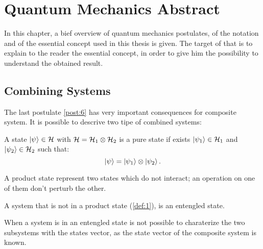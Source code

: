 \chapter{Quantum Mechanics Abstract}
    In this chapter, a bief overview of quantum mechanics postulates,
    of the notation and of the essential concept used in this thesis is given. 
    The target of that is to explain to the reader the essential concept, in 
    order to give him the possibility to understand the obtained result.

    

    \section{Combining Systems}
    The last postulate \ref{post:6} has very important consequences for composite system. It is possible
    to descrive two tipe of combined systems:

        \begin{definition}
            A state $\ket{\psi}\in\mathcal{H}$ with $\mathcal{H}=\mathcal{H}_1\otimes\mathcal{H}_2$ is a
            pure state if exists $\ket{\psi_1}\in\mathcal{H}_1$ and $\ket{\psi_2}\in\mathcal{H}_2$
            such that:
            \begin{equation*}
                \ket{\psi}=\ket{\psi_1}\otimes\ket{\psi_2}.
            \end{equation*}
            \label{def:1}
        \end{definition}
        A product state represent two states which do not interact; an operation on one of 
        them don't perturb the other.

        \begin{definition}
            A system that is not in a product state (\ref{def:1}), is an entengled state. 
            \label{def:2}
        \end{definition}
        When a system is in an entengled state is not possible to charaterize the two subsystems
        with the states vector, as the state vector of the composite system is known.

